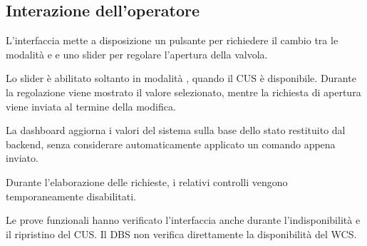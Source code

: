 \subsection{Interazione dell'operatore}

L'interfaccia mette a disposizione un pulsante per richiedere il cambio tra le modalità  e  e uno slider per regolare l'apertura della valvola.

Lo slider è abilitato soltanto in modalità , quando il CUS è disponibile.
Durante la regolazione viene mostrato il valore selezionato, mentre la richiesta di apertura viene inviata al termine della modifica.

La dashboard aggiorna i valori del sistema sulla base dello stato restituito dal backend, senza considerare automaticamente applicato un comando appena inviato.

Durante l'elaborazione delle richieste, i relativi controlli vengono temporaneamente disabilitati.

Le prove funzionali hanno verificato l'interfaccia anche durante l'indisponibilità e il ripristino del CUS.
Il DBS non verifica direttamente la disponibilità del WCS.
